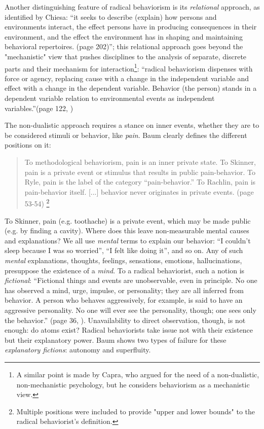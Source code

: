 \documentclass[letterpaper,11pt,twocolumn]{article}
\begin{document}
Another distinguishing feature of radical behaviorism is its \textit{relational} approach, as identified by Chiesa: \enquote{it seeks to describe (explain) how persons and environments interact, the effect persons have in producing consequences in their environment, and the effect the environment has in shaping and maintaining behavioral repertoires. (page 202)}\cite{chiesaRadicalBehaviorismPhilosophy1994}; this relational approach goes beyond the "mechanistic" view that pushes disciplines to the analysis of separate, discrete parts and their mechanism for interaction\footnote{A similar point is made by Capra\cite{capraTurningPointScience1983}, who argued for the need of a non-dualistic, non-mechanistic psychology, but he considers behaviorism as a mechanistic view.}: \enquote{radical behaviorism dispenses with force or agency, replacing cause with a change in the independent variable and effect with a change in the dependent variable. Behavior (the person) stands in a dependent variable relation to environmental events as independent variables.}(page 122, \cite{chiesaRadicalBehaviorismPhilosophy1994})

The non-dualistic approach requires a stance on inner events, whether they are to be considered stimuli or behavior, like \textit{pain}. Baum \cite{baumUnderstandingBehaviorismBehavior2017} clearly defines the different positions on it:
\begin{quote}
    To methodological behaviorism, pain is an inner private state. To Skinner, pain is a private event or stimulus that results in public pain-behavior. To Ryle, pain is the label of the category “pain-behavior.” To Rachlin, pain is pain-behavior itself. [...]  behavior never originates in private events. (page 53-54) \footnote{Multiple positions were included to provide "upper and lower bounds" to the radical behaviorist's definition.}
\end{quote}

To Skinner, pain (e.g. toothache) is a private event, which may be made public (e.g. by finding a cavity). Where does this leave non-measurable mental causes and explanations? We all use \textit{mental} terms to explain our behavior: \enquote{I couldn't sleep because I was so worried}, \enquote{I felt like doing it}, and so on. Any of such \textit{mental} explanations, thoughts, feelings, sensations, emotions, hallucinations, presuppose the existence of a \textit{mind}. To a radical behaviorist, such a notion is \textit{fictional}: \enquote{Fictional things and events are unobservable, even in principle. No one has observed a mind, urge, impulse, or personality; they are all inferred from behavior. A person who behaves aggressively, for example, is said to have an aggressive personality. No one will ever see the personality, though; one sees only the behavior.} (page 36, \cite{baumUnderstandingBehaviorismBehavior2017}). Unavailability to direct observation, though, is not enough: do atoms exist? Radical behaviorists take issue not with their existence but their explanatory power. Baum shows two types of failure for these \textit{explanatory fictions}: autonomy and superfluity.
\end{document}
